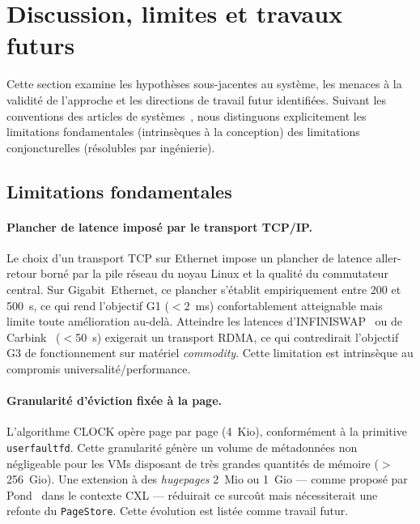 \section{Discussion, limites et travaux futurs}
\label{sec:discussion}

Cette section examine les hypothèses sous-jacentes au système, les menaces à la validité de l'approche et les directions de travail futur identifiées. Suivant les conventions des articles de systèmes~\cite{verma_2015_borg}, nous distinguons explicitement les limitations fondamentales (intrinsèques à la conception) des limitations conjoncturelles (résolubles par ingénierie).

\subsection{Limitations fondamentales}
\label{subsec:limites-fondamentales}

\paragraph{Plancher de latence imposé par le transport TCP/IP.}
Le choix d'un transport TCP sur Ethernet impose un plancher de latence aller-retour borné par la pile réseau du noyau Linux et la qualité du commutateur central. Sur Gigabit~Ethernet, ce plancher s'établit empiriquement entre 200 et 500~\textmu{}s, ce qui rend l'objectif G1 ($<$2~ms) confortablement atteignable mais limite toute amélioration au-delà. Atteindre les latences d'INFINISWAP~\cite{gu_2017_infiniswap} ou de Carbink~\cite{zhou_2022_carbink} ($<$50~\textmu{}s) exigerait un transport RDMA, ce qui contredirait l'objectif G3 de fonctionnement sur matériel \textit{commodity}. Cette limitation est intrinsèque au compromis universalité/performance.

\paragraph{Granularité d'éviction fixée à la page.}
L'algorithme CLOCK opère page par page (4~Kio), conformément à la primitive \texttt{userfaultfd}. Cette granularité génère un volume de métadonnées non négligeable pour les VMs disposant de très grandes quantités de mémoire ($>$256~Gio). Une extension à des \textit{hugepages} 2~Mio ou 1~Gio --- comme proposé par Pond~\cite{li_2023_pond} dans le contexte CXL --- réduirait ce surcoût mais nécessiterait une refonte du \texttt{PageStore}. Cette évolution est listée comme travail futur.

